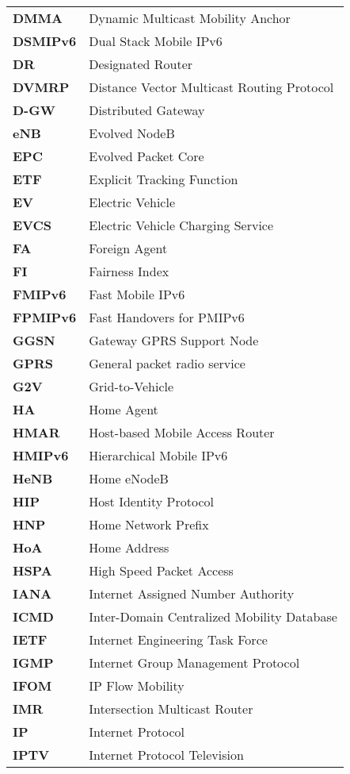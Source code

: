 \begin{center}
\begin{longtable}{p{5cm}p{8.8cm}}
\textbf{DMMA} & Dynamic Multicast Mobility Anchor\\
\textbf{DSMIPv6} & Dual Stack Mobile IPv6\\
\textbf{DR} & Designated Router\\
\textbf{DVMRP} & Distance Vector Multicast Routing Protocol \\
\textbf{D-GW} & Distributed Gateway\\
\textbf{eNB} & Evolved NodeB\\
\textbf{EPC} & Evolved Packet Core\\
\textbf{ETF} & Explicit Tracking Function\\
\textbf{EV} & Electric Vehicle\\
\textbf{EVCS} & Electric Vehicle Charging Service\\
\textbf{FA} & Foreign Agent\\
\textbf{FI} & Fairness Index\\
\textbf{FMIPv6} & Fast Mobile IPv6\\
\textbf{FPMIPv6} & Fast Handovers for PMIPv6\\
\textbf{GGSN} & Gateway GPRS Support Node\\
\textbf{GPRS} & General packet radio service\\
\textbf{G2V} & Grid-to-Vehicle\\
\textbf{HA} & Home Agent\\
\textbf{HMAR} & Host-based Mobile Access Router \\
\textbf{HMIPv6} & Hierarchical Mobile IPv6\\
\textbf{HeNB} & Home eNodeB\\
\textbf{HIP} & Host Identity Protocol \\
\textbf{HNP} & Home Network Prefix\\
\textbf{HoA} & Home Address\\
\textbf{HSPA} & High Speed Packet Access\\

\textbf{IANA} & Internet Assigned Number Authority \\
\textbf{ICMD} & Inter-Domain Centralized Mobility Database\\
\textbf{IETF} & Internet Engineering Task Force\\
\textbf{IGMP} & Internet Group Management Protocol\\
\textbf{IFOM} & IP Flow Mobility\\
\textbf{IMR} & Intersection Multicast Router\\
\textbf{IP} & Internet Protocol\\
\textbf{IPTV} & Internet Protocol Television\\


\end{longtable}
\end{center}
